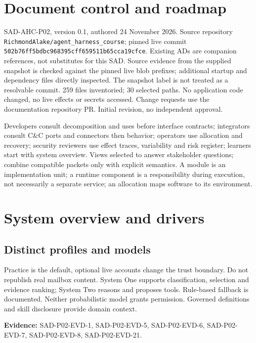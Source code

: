 \documentclass[10pt,letterpaper]{article}
\begin{document}
\makedoctitle
\tableofcontents
\listoffigures
\listoftables
\clearpage
\section{Document control and roadmap}
SAD-AHC-P02, version 0.1, authored 24 November 2026. Source repository \nolinkurl{RichmondAlake/agent_harness_course}; pinned live commit \nolinkurl{502b76ff5bdbc968395cff659511b65cca19cfce}. Existing ADs are companion references, not substitutes for this SAD. Source evidence from the supplied snapshot is checked against the pinned live blob prefixes; additional startup and dependency files directly inspected. The snapshot label is not treated as a resolvable commit. 259 files inventoried; 30 selected paths. No application code changed, no live effects or secrets accessed. Change requests use the documentation repository PR. Initial revision, no independent approval.
\par Developers consult decomposition and uses before interface contracts; integrators consult C\&C ports and connectors then behavior; operators use allocation and recovery; security reviewers use effect traces, variability and risk register; learners start with system overview. Views selected to answer stakeholder questions; combine compatible packets only with explicit semantics. A module is an implementation unit; a runtime component is a responsibility during execution, not necessarily a separate service; an allocation maps software to its environment.
\section{System overview and drivers}
\subsection{Distinct profiles and models}
Practice is the default, optional live accounts change the trust boundary. Do not republish real mailbox content. System One supports classification, selection and evidence ranking; System Two reasons and proposes tools. Rule-based fallback is documented. Neither probabilistic model grants permission. Governed definitions and skill disclosure provide domain context.\par\textbf{Evidence:} SAD-P02-EVD-1, SAD-P02-EVD-5, SAD-P02-EVD-6, SAD-P02-EVD-7, SAD-P02-EVD-8, SAD-P02-EVD-21.\par
\end{document}
